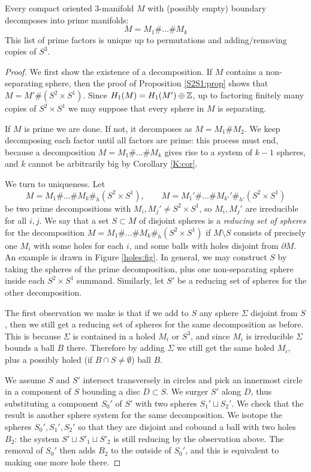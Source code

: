 \begin{teo} \label{prime:teo}
Every compact oriented 3-manifold $M$ with (possibly empty) boundary decomposes into prime manifolds:
$$M = M_1\# \ldots \# M_k$$
This list of prime factors is unique up to permutations and adding/removing copies of $S^3$.
\end{teo}
\begin{proof}
We first show the existence of a decomposition. If $M$ contains a non-separating sphere, then the proof of Proposition \ref{S2S1:prop} shows that $M = M'\# (S^2\times S^1)$. Since $H_1(M) = H_1(M')\oplus \mathbb{Z}$, up to factoring finitely many copies of $S^2\times S^1$ we may suppose that every sphere in $M$ is separating.

If $M$ is prime we are done. If not, it decomposes as $M=M_1\# M_2$. We keep decomposing each factor until all factors are prime: this process must end, because a decomposition $M=M_1\# \ldots \#M_k$ gives rise to a system of $k-1$ spheres, and $k$ cannot be arbitrarily big by Corollary \ref{K:cor}.

We turn to uniqueness. Let 
$$M = M_1\# \ldots \# M_k \#_h(S^2\times S^1), \qquad M = M_1'\# \ldots \# M_{k'}'\#_{h'}(S^2\times S^1)$$
be two prime decompositions with $M_i, M_j' \neq S^2\times S^1$, so $M_i, M_j'$ are irreducible for all $i,j$. We say that a set $S \subset M$ of disjoint spheres is a \emph{reducing set of spheres} for the decomposition $M=M_1\# \ldots \# M_k\#_h(S^2\times S^1)$ if $M\setminus S$ consists of precisely one $M_i$ with some holes for each $i$, and some balls with holes disjoint from $\partial M$. An example is drawn in Figure \ref{holes:fig}. In general, we may construct $S$ by taking the spheres of the prime decomposition, plus one non-separating sphere inside each $S^2\times S^1$ summand. Similarly, let $S'$ be a reducing set of spheres for the other decomposition.

The first observation we make is that if we add to $S$ any sphere $\Sigma$ disjoint from $S$, then we still get a reducing set of spheres for the same decomposition as before. This is because $\Sigma$ is contained in a holed $M_i$ or $S^3$, and since $M_i$ is irreducible $\Sigma$ bounds a ball $B$ there. Therefore by adding $\Sigma$ we still get the same holed $M_i$, plus a possibly holed (if $B\cap S \neq \emptyset$) ball $B$.

We assume $S$ and $S'$ intersect transversely in circles and pick an innermost circle in a component of $S$ bounding a disc $D\subset S$. We surger $S'$ along $D$, thus substituting a component $S_0'$ of $S'$ with two spheres $S_1' \sqcup S_2'$. We check that the result is another sphere system for the same decomposition. We isotope the spheres $S_0', S_1', S_2'$ so that they are disjoint and cobound a ball with two holes $B_2$: the system $S'\sqcup S'_1 \sqcup S'_2$ is still reducing by the observation above. The removal of $S_0'$ then adds $B_2$ to the outside of $S_0'$, and this is equivalent to making one more hole there. 


\end{proof}
